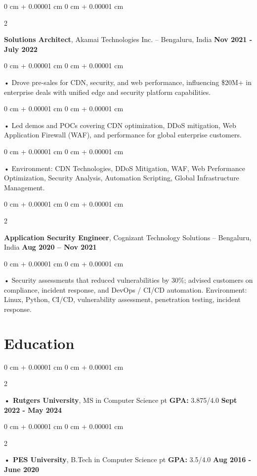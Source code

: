 \documentclass[10pt, letterpaper]{article}
\newenvironment{onecolentry}{
    \begin{adjustwidth}{
        0 cm + 0.00001 cm
    }{
        0 cm + 0.00001 cm
    }
}{
    \end{adjustwidth}
} %
\newenvironment{twocolentry}[2][]{
    \onecolentry
    \def\secondColumn{#2}
    \setcolumnwidth{\fill, 4.5 cm}
    \begin{paracol}{2}
}{
    \switchcolumn \raggedleft \secondColumn
    \end{paracol}
    \endonecolentry
} %
\begin{document}
        \begin{twocolentry}{
            \textbf{Nov 2021 - July 2022}
        }
            \textbf{Solutions Architect}, Akamai Technologies Inc. -- Bengaluru, India \end{twocolentry}
        \begin{onecolentry}
            • Drove pre-sales for CDN, security, and web performance, influencing \$20M+ in enterprise deals with unified edge and security platform capabilities.
        \end{onecolentry}
        \begin{onecolentry}
            • Led demos and POCs covering CDN optimization, DDoS mitigation, Web Application Firewall (WAF), and performance for global enterprise customers.
        \end{onecolentry}
        \begin{onecolentry}
             • Environment: CDN Technologies, DDoS Mitigation, WAF, Web Performance Optimization, Security Analysis, Automation Scripting, Global Infrastructure Management.
        \end{onecolentry}

        \begin{twocolentry}{
            \textbf{Aug 2020 – Nov 2021}
        }
            \textbf{Application Security Engineer}, Cognizant Technology Solutions -- Bengaluru, India\end{twocolentry}
        \begin{onecolentry}
             • Security assessments that reduced vulnerabilities by 30\%; advised customers on compliance, incident response, and DevOps / CI/CD automation. Environment: Linux, Python, CI/CD, vulnerability assessment, penetration testing, incident response.
        \end{onecolentry}
    \vspace{2 pt }
        \section{Education}
        \vspace{2 pt }
        \begin{twocolentry}{
            \textbf{Sept 2022 - May 2024}
        }
            \textbf{ • Rutgers University}, MS in Computer Science  pt \textbf{GPA:} 3.875/4.0  \end{twocolentry}

        \begin{twocolentry}{
            \textbf{Aug 2016 - June 2020}
        }
            \textbf{ • PES University}, B.Tech in Computer Science  pt \textbf{GPA:} 3.5/4.0  \end{twocolentry}
\end{document}

